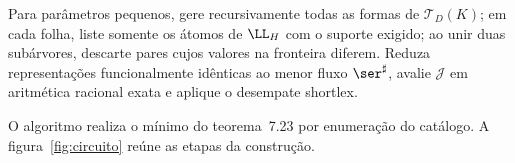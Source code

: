 \begin{algoritmo}
\leavevmode\par\nobreak\noindent
Para parâmetros pequenos, gere recursivamente todas as formas de $\mathcal T_D(K)$; em cada folha, liste somente os átomos de $\LL_H$ com o suporte exigido; ao unir duas subárvores, descarte pares cujos valores na fronteira diferem. Reduza representações funcionalmente idênticas ao menor fluxo $\ser^\sharp$, avalie $\mathcal J$ em aritmética racional exata e aplique o desempate shortlex.
\end{algoritmo}
O algoritmo realiza o mínimo do teorema~7.23 por enumeração do catálogo. A figura~\ref{fig:circuito} reúne as etapas da construção.

\clearpage
